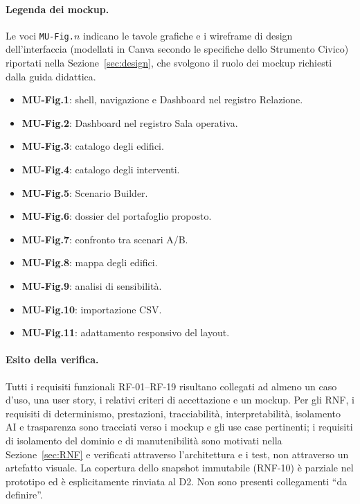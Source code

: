 \paragraph{Legenda dei mockup.}
Le voci \texttt{MU-Fig.$n$} indicano le tavole grafiche e i wireframe di design dell'interfaccia (modellati in Canva secondo le specifiche dello Strumento Civico) riportati nella Sezione~\ref{sec:design}, che svolgono il ruolo dei mockup richiesti dalla guida didattica.
\begin{itemize}[leftmargin=1.4em, itemsep=0.15em]
    \item \textbf{MU-Fig.1}: shell, navigazione e Dashboard nel registro Relazione.
    \item \textbf{MU-Fig.2}: Dashboard nel registro Sala operativa.
    \item \textbf{MU-Fig.3}: catalogo degli edifici.
    \item \textbf{MU-Fig.4}: catalogo degli interventi.
    \item \textbf{MU-Fig.5}: Scenario Builder.
    \item \textbf{MU-Fig.6}: dossier del portafoglio proposto.
    \item \textbf{MU-Fig.7}: confronto tra scenari A/B.
    \item \textbf{MU-Fig.8}: mappa degli edifici.
    \item \textbf{MU-Fig.9}: analisi di sensibilità.
    \item \textbf{MU-Fig.10}: importazione CSV.
    \item \textbf{MU-Fig.11}: adattamento responsivo del layout.
\end{itemize}

\paragraph{Esito della verifica.}
Tutti i requisiti funzionali RF-01--RF-19 risultano collegati ad almeno un caso d'uso, una user story, i relativi criteri di accettazione e un mockup. Per gli RNF, i requisiti di determinismo, prestazioni, tracciabilità, interpretabilità, isolamento AI e trasparenza sono tracciati verso i mockup e gli use case pertinenti; i requisiti di isolamento del dominio e di manutenibilità sono motivati nella Sezione~\ref{sec:RNF} e verificati attraverso l'architettura e i test, non attraverso un artefatto visuale. La copertura dello snapshot immutabile (RNF-10) è parziale nel prototipo ed è esplicitamente rinviata al D2. Non sono presenti collegamenti ``da definire''.
